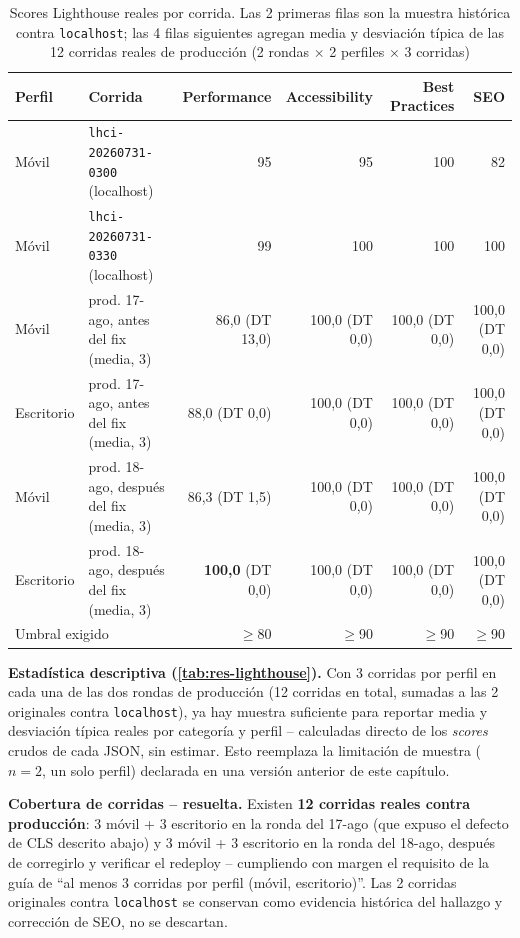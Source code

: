 \begin{table}[h]
\centering
\scriptsize
\setlength{\tabcolsep}{2pt}
\begin{tabular}{llrrrr}
\toprule
Perfil & Corrida & Performance & Accessibility & Best Practices & SEO \\
\midrule
Móvil & \texttt{lhci-20260731-0300} (localhost) & 95 & 95 & 100 & 82 \\
Móvil & \texttt{lhci-20260731-0330} (localhost) & 99 & 100 & 100 & 100 \\
Móvil & prod. 17-ago, antes del fix (media, 3) & 86,0 (DT 13,0) & 100,0 (DT 0,0) & 100,0 (DT 0,0) & 100,0 (DT 0,0) \\
Escritorio & prod. 17-ago, antes del fix (media, 3) & 88,0 (DT 0,0) & 100,0 (DT 0,0) & 100,0 (DT 0,0) & 100,0 (DT 0,0) \\
Móvil & prod. 18-ago, después del fix (media, 3) & 86,3 (DT 1,5) & 100,0 (DT 0,0) & 100,0 (DT 0,0) & 100,0 (DT 0,0) \\
Escritorio & prod. 18-ago, después del fix (media, 3) & \textbf{100,0} (DT 0,0) & 100,0 (DT 0,0) & 100,0 (DT 0,0) & 100,0 (DT 0,0) \\
\midrule
\multicolumn{2}{l}{Umbral exigido} & $\geq$80 & $\geq$90 & $\geq$90 & $\geq$90 \\
\bottomrule
\end{tabular}
\caption{Scores Lighthouse reales por corrida. Las 2 primeras filas son
  la muestra histórica contra \texttt{localhost}; las 4 filas
  siguientes agregan media y desviación típica de las 12 corridas
  reales de producción (2 rondas $\times$ 2 perfiles $\times$ 3
  corridas)}
\label{tab:res-lighthouse}
\end{table}

\textbf{Estadística descriptiva (\autoref{tab:res-lighthouse}).} Con 3 corridas por perfil en cada una
de las dos rondas de producción (12 corridas en total, sumadas a las 2
originales contra \texttt{localhost}), ya hay muestra suficiente para
reportar media y desviación típica reales por categoría y perfil --
calculadas directo de los \emph{scores} crudos de cada JSON, sin
estimar. Esto reemplaza la limitación de muestra ($n=2$, un solo
perfil) declarada en una versión anterior de este capítulo.

\textbf{Cobertura de corridas -- resuelta.} Existen \textbf{12 corridas
reales contra producción}: 3 móvil + 3 escritorio en la ronda del
17-ago (que expuso el defecto de CLS descrito abajo) y 3 móvil + 3
escritorio en la ronda del 18-ago, después de corregirlo y verificar el
redeploy -- cumpliendo con margen el requisito de la guía de ``al menos
3 corridas por perfil (móvil, escritorio)''. Las 2 corridas originales
contra \texttt{localhost} se conservan como evidencia histórica del
hallazgo y corrección de SEO, no se descartan.

